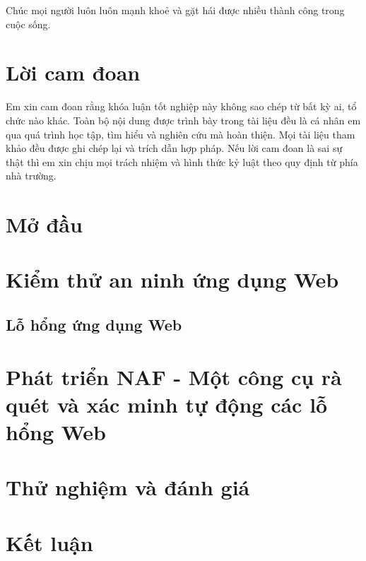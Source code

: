 \documentclass[12pt,a4paper]{report}
\begin{document}
Chúc mọi người luôn luôn mạnh khoẻ và gặt hái được nhiều thành công trong cuộc sống.

\chapter*{Lời cam đoan}

Em xin cam đoan rằng khóa luận tốt nghiệp này không sao chép từ bất kỳ ai,
tổ chức nào khác. Toàn bộ nội dung được trình bày trong tài liệu đều là cá nhân em qua quá
trình học tập, tìm hiểu và nghiên cứu mà hoàn thiện. Mọi tài liệu tham khảo đều được ghi chép
lại và trích dẫn hợp pháp. Nếu lời cam đoan là sai sự thật thì em xin chịu mọi trách nhiệm và
hình thức kỷ luật theo quy định từ phía nhà trường.

\tableofcontents{}
\clearpage{}

\listoffigures{}

\listoftables{}

\chapter{Mở đầu}



\chapter{Kiểm thử an ninh ứng dụng Web}

\section{Lỗ hổng ứng dụng Web}


\chapter{Phát triển NAF - Một công cụ rà quét và xác minh tự động các lỗ hổng Web}


\chapter{Thử nghiệm và đánh giá}


\chapter{Kết luận}



\nocite{*}
\printbibliography[heading=bibintoc, title=Tài liệu tham khảo]

\end{document}
